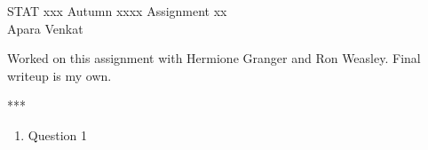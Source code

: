 \documentclass[11pt]{article}
\newcommand{\dinkus}{\begin{center}***\end{center}}
\begin{document}
STAT xxx Autumn xxxx \hfill Assignment xx\\
Apara Venkat

\hrulefill

Worked on this assignment with Hermione Granger and Ron Weasley. Final writeup is my own. \\

\dinkus


\begin{enumerate}

\item Question 1


\end{enumerate}



\begin{comment}

	
	
	
	
	
	
	\appendix
	\section{Code}
	
	
	\begin{figure}[!tbh]
		\centering
		\texttt{[image: image.png]}
		\caption{Image}
		\label{fig:img}
	\end{figure}

	
	\begin{figure*}[!tbh]
    	\centering
		
    	\begin{subfigure}[t]{0.5\textwidth}
        	\centering
	        \texttt{[image: image\_a.png]}
    	    \caption{Image (a)}
        	\label{fig:img-a}
	    \end{subfigure}%
    	~ 
	
	    \begin{subfigure}[t]{0.5\textwidth}
    	    \centering
        	\texttt{[image: image\_b.png.png]}
	        \caption{Image (b)}
    	    \label{fig:img-b}
	    \end{subfigure}
	    
	    \caption{Image}
    	\label{fig:img}
	\end{figure*}
	
	
	\begin{table}[!tbh]
		\centering
		\begin{tabular}{cccc}
			\hline
			\textbf{Column 1} & \textbf{Column 2} & \textbf{Column 3} & \textbf{Column 4} \\
			\hline
			\hline
			1 & & & \\
			2 & & & \\
			\hline
		\end{tabular}
		\caption{Table.}
		\label{tab:table}
	\end{table}
	
\end{comment}
\end{document}
